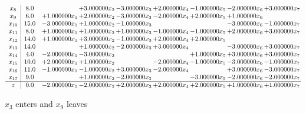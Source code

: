 \documentclass[10pt]{article}
\begin{document}
\[\begin{array}{c| c c@{\hskip 2pt} c@{\hskip 2pt} c@{\hskip 2pt} c@{\hskip 2pt} c@{\hskip 2pt} c@{\hskip 2pt} c@{\hskip 2pt} }
 x_{8}   &  8.0  &   & + 3.000000 x_{2} & -3.000000 x_{3} & + 2.000000 x_{4} & -1.000000 x_{5} & -2.000000 x_{6} & + 3.000000 x_{7}\\
 x_{9}   &  6.0 & + 1.000000 x_{1} & + 2.000000 x_{2} & -3.000000 x_{3} & -2.000000 x_{4} & + 2.000000 x_{5} & + 1.000000 x_{6} &   \\
 x_{10}   &  15.0 & -3.000000 x_{1} & + 1.000000 x_{2} & -1.000000 x_{3} &    &   & -3.000000 x_{6} & -1.000000 x_{7}\\
 x_{11}   &  8.0 & + 1.000000 x_{1} & + 1.000000 x_{2} & + 1.000000 x_{3} & -1.000000 x_{4} & -1.000000 x_{5} & + 2.000000 x_{6} & + 3.000000 x_{7}\\
 x_{12}   &  14.0 & + 1.000000 x_{1} & + 3.000000 x_{2} & -1.000000 x_{3} & + 2.000000 x_{4} & + 2.000000 x_{5} &    &   \\
 x_{13}   &  14.0  &   & + 1.000000 x_{2} & -2.000000 x_{3} & + 3.000000 x_{4} &   & -3.000000 x_{6} & + 3.000000 x_{7}\\
 x_{14}   &  4.0 & -2.000000 x_{1} & -3.000000 x_{2} &    &   & + 1.000000 x_{5} & + 3.000000 x_{6} & + 3.000000 x_{7}\\
 x_{15}   &  10.0 & + 2.000000 x_{1} & + 1.000000 x_{2} &   & -2.000000 x_{4} & -1.000000 x_{5} & -3.000000 x_{6} & -1.000000 x_{7}\\
 x_{16}   &  11.0 & -1.000000 x_{1} & -1.000000 x_{2} & + 3.000000 x_{3} & -2.000000 x_{4} &   & + 3.000000 x_{6} & -3.000000 x_{7}\\
 x_{17}   &  9.0  &   & + 1.000000 x_{2} & -2.000000 x_{3} &   & -3.000000 x_{5} & -2.000000 x_{6} & -2.000000 x_{7}\\
\hline
z    &  0.0 & -2.000000 x_{1} & -2.000000 x_{2} & + 2.000000 x_{3} & + 2.000000 x_{4} & + 2.000000 x_{5} & + 1.000000 x_{6} & + 1.000000 x_{7}\\
\end{array}\]


 $ x_{3} $ enters and $ x_{9} $ leaves 
\end{document}
